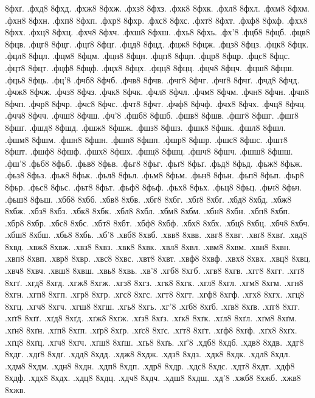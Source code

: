 {8фхґ.
.фхд8
8фхд.
.фхж8
8фхж.
.фхз8
8фхз.
.фхк8
8фхк.
.фхл8
8фхл.
.фхм8
8фхм.
.фхн8
8фхн.
.фхп8
8фхп.
.фхр8
8фхр.
.фхс8
8фхс.
.фхт8
8фхт.
.фхф8
8фхф.
.фхх8
8фхх.
.фхц8
8фхц.
.фхч8
8фхч.
.фхш8
8фхш.
.фхь8
8фхь.
.фх'8
.фцб8
8фцб.
.фцв8
8фцв.
.фцг8
8фцг.
.фцґ8
8фцґ.
.фцд8
8фцд.
.фцж8
8фцж.
.фцз8
8фцз.
.фцк8
8фцк.
.фцл8
8фцл.
.фцм8
8фцм.
.фцн8
8фцн.
.фцп8
8фцп.
.фцр8
8фцр.
.фцс8
8фцс.
.фцт8
8фцт.
.фцф8
8фцф.
.фцх8
8фцх.
.фцц8
8фцц.
.фцч8
8фцч.
.фцш8
8фцш.
.фць8
8фць.
.фц'8
.фчб8
8фчб.
.фчв8
8фчв.
.фчг8
8фчг.
.фчґ8
8фчґ.
.фчд8
8фчд.
.фчж8
8фчж.
.фчз8
8фчз.
.фчк8
8фчк.
.фчл8
8фчл.
.фчм8
8фчм.
.фчн8
8фчн.
.фчп8
8фчп.
.фчр8
8фчр.
.фчс8
8фчс.
.фчт8
8фчт.
.фчф8
8фчф.
.фчх8
8фчх.
.фчц8
8фчц.
.фчч8
8фчч.
.фчш8
8фчш.
.фч'8
.фшб8
8фшб.
.фшв8
8фшв.
.фшг8
8фшг.
.фшґ8
8фшґ.
.фшд8
8фшд.
.фшж8
8фшж.
.фшз8
8фшз.
.фшк8
8фшк.
.фшл8
8фшл.
.фшм8
8фшм.
.фшн8
8фшн.
.фшп8
8фшп.
.фшр8
8фшр.
.фшс8
8фшс.
.фшт8
8фшт.
.фшф8
8фшф.
.фшх8
8фшх.
.фшц8
8фшц.
.фшч8
8фшч.
.фшш8
8фшш.
.фш'8
.фьб8
8фьб.
.фьв8
8фьв.
.фьг8
8фьг.
.фьґ8
8фьґ.
.фьд8
8фьд.
.фьж8
8фьж.
.фьз8
8фьз.
.фьк8
8фьк.
.фьл8
8фьл.
.фьм8
8фьм.
.фьн8
8фьн.
.фьп8
8фьп.
.фьр8
8фьр.
.фьс8
8фьс.
.фьт8
8фьт.
.фьф8
8фьф.
.фьх8
8фьх.
.фьц8
8фьц.
.фьч8
8фьч.
.фьш8
8фьш.
.хбб8
8хбб.
.хбв8
8хбв.
.хбг8
8хбг.
.хбґ8
8хбґ.
.хбд8
8хбд.
.хбж8
8хбж.
.хбз8
8хбз.
.хбк8
8хбк.
.хбл8
8хбл.
.хбм8
8хбм.
.хбн8
8хбн.
.хбп8
8хбп.
.хбр8
8хбр.
.хбс8
8хбс.
.хбт8
8хбт.
.хбф8
8хбф.
.хбх8
8хбх.
.хбц8
8хбц.
.хбч8
8хбч.
.хбш8
8хбш.
.хбь8
8хбь.
.хб'8
.хвб8
8хвб.
.хвв8
8хвв.
.хвг8
8хвг.
.хвґ8
8хвґ.
.хвд8
8хвд.
.хвж8
8хвж.
.хвз8
8хвз.
.хвк8
8хвк.
.хвл8
8хвл.
.хвм8
8хвм.
.хвн8
8хвн.
.хвп8
8хвп.
.хвр8
8хвр.
.хвс8
8хвс.
.хвт8
8хвт.
.хвф8
8хвф.
.хвх8
8хвх.
.хвц8
8хвц.
.хвч8
8хвч.
.хвш8
8хвш.
.хвь8
8хвь.
.хв'8
.хгб8
8хгб.
.хгв8
8хгв.
.хгг8
8хгг.
.хгґ8
8хгґ.
.хгд8
8хгд.
.хгж8
8хгж.
.хгз8
8хгз.
.хгк8
8хгк.
.хгл8
8хгл.
.хгм8
8хгм.
.хгн8
8хгн.
.хгп8
8хгп.
.хгр8
8хгр.
.хгс8
8хгс.
.хгт8
8хгт.
.хгф8
8хгф.
.хгх8
8хгх.
.хгц8
8хгц.
.хгч8
8хгч.
.хгш8
8хгш.
.хгь8
8хгь.
.хг'8
.хґб8
8хґб.
.хґв8
8хґв.
.хґг8
8хґг.
.хґґ8
8хґґ.
.хґд8
8хґд.
.хґж8
8хґж.
.хґз8
8хґз.
.хґк8
8хґк.
.хґл8
8хґл.
.хґм8
8хґм.
.хґн8
8хґн.
.хґп8
8хґп.
.хґр8
8хґр.
.хґс8
8хґс.
.хґт8
8хґт.
.хґф8
8хґф.
.хґх8
8хґх.
.хґц8
8хґц.
.хґч8
8хґч.
.хґш8
8хґш.
.хґь8
8хґь.
.хґ'8
.хдб8
8хдб.
.хдв8
8хдв.
.хдг8
8хдг.
.хдґ8
8хдґ.
.хдд8
8хдд.
.хдж8
8хдж.
.хдз8
8хдз.
.хдк8
8хдк.
.хдл8
8хдл.
.хдм8
8хдм.
.хдн8
8хдн.
.хдп8
8хдп.
.хдр8
8хдр.
.хдс8
8хдс.
.хдт8
8хдт.
.хдф8
8хдф.
.хдх8
8хдх.
.хдц8
8хдц.
.хдч8
8хдч.
.хдш8
8хдш.
.хд'8
.хжб8
8хжб.
.хжв8
8хжв.
}
